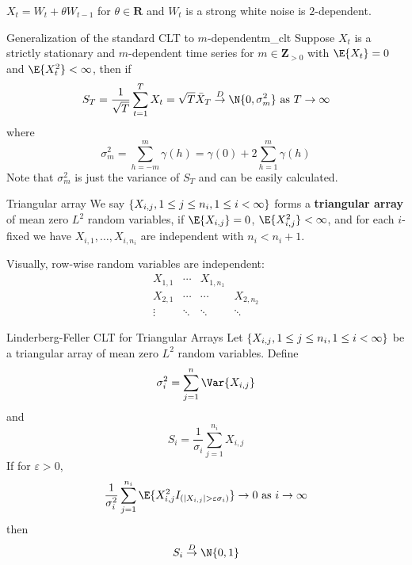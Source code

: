 \begin{Example}{}{}
    $ X_t=W_{t}+\theta W_{t-1} $ for $ \theta\in\mathbf{R} $
    and $ W_{t} $ is a strong white noise is $ 2 $-dependent.
\end{Example}
\begin{Theorem}{Generalization of the standard CLT to $ m $-dependent}{m_clt}
    Suppose $ X_t $ is a strictly stationary
    and $ m $-dependent time series for $ m\in\mathbf{Z}_{>0} $
    with $ \E{X_t}=0 $ and $ \E{X_t^2}<\infty $, then if
    \[ S_T=\frac{1}{\sqrt{T}} \sum_{t=1}^{T}X_t=\sqrt{T}\bar{X}_T
        \stackrel{D}{\to}\N{0,\sigma_m^2}\text{ as }T\to\infty  \]
    where
    \[ \sigma_m^2=\sum_{h=-m}^{m} \gamma(h)=\gamma(0)+2 \sum_{h=1}^{m} \gamma(h) \]
    Note that $ \sigma_m^2 $ is just the variance of $ S_T $
    and can be easily calculated.
\end{Theorem}
\begin{Definition}{Triangular array}{}
    We say $ \{X_{i,j},1\le j\le n_i,1\le i<\infty\} $ forms a
    \textbf{triangular array} of mean zero $ L^2 $ random
    variables, if $ \E{X_{i,j}}=0 $, $ \E{X_{i,j}^2}<\infty $, and
    for each $ i $-fixed we have $ X_{i,1},\ldots,X_{i,n_i} $
    are independent with $ n_i<n_i+1 $.
\end{Definition}
Visually, row-wise random variables are independent:
\[ \begin{matrix}
        X_{1,1} & \cdots & X_{1,n_1}             \\
        X_{2,1} & \cdots & \cdots    & X_{2,n_2} \\
        \vdots  & \ddots & \ddots    & \ddots
    \end{matrix} \]
\begin{Theorem}{Linderberg-Feller CLT for Triangular Arrays}{}
    Let $ \{X_{i,j},1\le j\le n_i,1\le i<\infty\} $
    be a triangular array of mean zero $ L^2 $ random variables.
    Define
    \[ \sigma_i^2=\sum_{j=1}^{n} \Var{X_{i,j}} \]
    and
    \[ S_i=\frac{1}{\sigma_i} \sum_{j=1}^{n_i} X_{i,j} \]
    If for $ \varepsilon>0 $,
    \[ \frac{1}{\sigma_i^2}\sum_{j=1}^{n_i} \E{X_{i,j}^2 I_{(\abs{X_{i,j}}>\varepsilon\sigma_i)}}\to 0
        \text{ as } i\to\infty \]
    then
    \[ S_i\stackrel{D}{\to}\N{0,1} \]
\end{Theorem}
